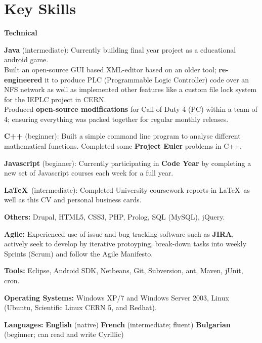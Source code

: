 \documentclass[final,a4paper,notitlepage,10pt]{report}
\begin{document}
\section*{Key Skills {\hfill\raisebox{.5ex}{\makebox[.65\textwidth]{\hrulefill}}}}
{\bf Technical}
\vspace*{-0.5\baselineskip}
\begin{compactitemize}
	\item \textbf{Java} (intermediate): Currently building final year project as a educational android game.\\
	Built an open-source GUI based XML-editor based on an older tool; \textbf{re-engineered} it to produce PLC (Programmable Logic Controller) code over an NFS network as well as implemented other features like a custom file lock system for the IEPLC project in CERN.\\
	Produced \textbf{open-source modifications} for Call of Duty 4 (PC) within a team of 4; ensuring everything was packed together for regular monthly releases.
	\item \textbf{C++} (beginner): Built a simple command line program to analyse different mathematical functions. Completed some \textbf{Project Euler} problems in C++.
	\item \textbf{Javascript} (beginner): Currently participating in \textbf{Code Year} by completing a new set of Javascript courses each week for a full year.
	\item \textbf{\LaTeX}\ (intermediate): Completed University coursework reports in \LaTeX\ as well as this CV and personal business cards.
	\item \textbf{Others:} Drupal, HTML5, CSS3, PHP, Prolog, SQL (MySQL), jQuery.
	\item \textbf{Agile:} Experienced use of issue and bug tracking software such as \textbf{JIRA}, actively seek to develop by iterative protoyping, break-down tasks into weekly Sprints (Scrum) and follow the Agile Manifesto.
	\item \textbf{Tools:} Eclipse, Android SDK, Netbeans, Git, Subversion, ant, Maven, jUnit, cron.
	\item \textbf{Operating Systems:} Windows XP/7 and Windows Server 2003, Linux (Ubuntu, Scientific Linux CERN 5, and Redhat).
\end{compactitemize}

{\bf Languages:} \qquad \textbf{English} (native) \quad \textbf{French} (intermediate; fluent) \quad \textbf{Bulgarian} (beginner; can read and write Cyrillic)
\end{document}
